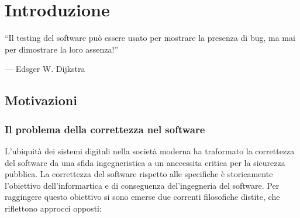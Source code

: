 \chapter{Introduzione}
\label{chap:introduction}

\vspace{1em}
\epigraph{
    \enquote{Il testing del software può essere usato per mostrare la presenza di bug, ma mai per dimostrare la loro assenza!}}
    {--- \textup{Edsger W. Dijkstra \cite{dijkstra1970notes}}
}
\vspace{2em}

\section{Motivazioni}

\subsection{Il problema della correttezza nel software}
L'ubiquità dei sistemi digitali nella società moderna ha traformato la correttezza del software da una sfida ingegneristica
a un anecessita critica per la sicurezza pubblica. La correttezza del software rispetto alle specifiche è storicamente l'obiettivo
dell'informartica e di conseguenza del'ingegneria del software. Per raggingere questo obiettivo si sono emerse due correnti 
filosofiche distite, che riflettono approcci opposti:

